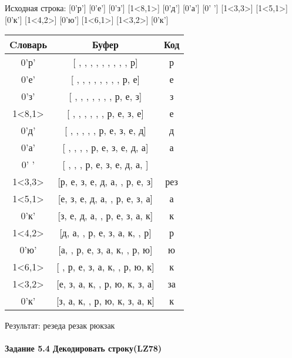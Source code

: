 \documentclass[a4paper, 12pt]{article}
\begin{document}
Исходная строка: [0'р'] [0'е'] [0'з'] [1<8,1>] [0'д'] [0'а'] [0' '] [1<3,3>] [1<5,1>] [0'к'] [1<4,2>] [0'ю'] [1<6,1>] [1<3,2>] [0'к']\\
\begin{table}[h!]
\centering
\begin{tabular}{|c|c|c|}
\hline
 Cловарь & Буфер & Код  \\ \hline
0'р' & [ ,  ,  ,  ,  ,  ,  ,  ,  , р] & р
\\ \hline
0'е' & [ ,  ,  ,  ,  ,  ,  ,  , р, е] & е
\\ \hline
0'з' & [ ,  ,  ,  ,  ,  ,  , р, е, з] & з
\\ \hline
1<8,1> & [ ,  ,  ,  ,  ,  , р, е, з, е] & е
\\ \hline
0'д' & [ ,  ,  ,  ,  , р, е, з, е, д] & д
\\ \hline
0'а' & [ ,  ,  ,  , р, е, з, е, д, а] & а
\\ \hline
0' ' & [ ,  ,  , р, е, з, е, д, а,  ] &  
\\ \hline
1<3,3> & [р, е, з, е, д, а,  , р, е, з] & рез
\\ \hline
1<5,1> & [е, з, е, д, а,  , р, е, з, а] & а
\\ \hline
0'к' & [з, е, д, а,  , р, е, з, а, к] & к
\\ \hline
1<4,2> & [д, а,  , р, е, з, а, к,  , р] &  р
\\ \hline
0'ю' & [а,  , р, е, з, а, к,  , р, ю] & ю
\\ \hline
1<6,1> & [ , р, е, з, а, к,  , р, ю, к] & к
\\ \hline
1<3,2> & [е, з, а, к,  , р, ю, к, з, а] & за
\\ \hline
0'к' & [з, а, к,  , р, ю, к, з, а, к] & к
\\ \hline
\end{tabular}
\end{table}

Результат: резеда резак рюкзак
\pagebreak
\paragraph{Задание 5.4 Декодировать строку(LZ78)\\}
\end{document}

